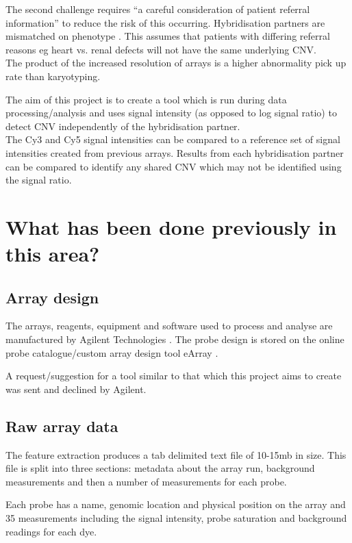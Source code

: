 The second challenge requires ``a careful consideration of patient referral information'' to reduce the risk of this occurring. Hybridisation partners are mismatched on phenotype \citep{ahn2010}. This assumes that patients with differing referral reasons eg heart vs. renal defects will not have the same underlying \ac{CNV}.\\

The product of the increased resolution of arrays is a higher abnormality pick up rate than karyotyping. 

The aim of this project is to create a tool which is run during data processing/analysis and uses signal intensity (as opposed to log signal ratio) to detect \ac{CNV} independently of the hybridisation partner.\\
The Cy3 and Cy5 signal intensities can be compared to a reference set of signal intensities created from previous arrays. Results from each hybridisation partner can be compared to identify any shared \ac{CNV} which may not be identified using the signal ratio.

\section{What has been done previously in this area?}
\subsection{Array design}
The arrays, reagents, equipment and software used to process and analyse are manufactured by Agilent Technologies \citep{agilenttechnologieshome}. The probe design is stored on the online probe catalogue/custom array design tool eArray \citep{agilenttechnologies_earray}.

A request/suggestion for a tool similar to that which this project aims to create was sent and declined by Agilent.

\subsection{Raw array data}
The feature extraction produces a tab delimited text file of 10-15mb in size.
This file is split into three sections: metadata about the array run, background measurements and then a number of measurements for each probe.

Each probe has a name, genomic location and physical position on the array and 35 measurements including the signal intensity, probe saturation and background readings for each dye.

